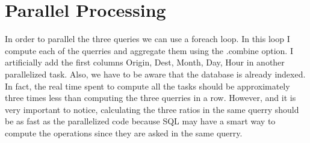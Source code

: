 \documentclass{llncs}\usepackage[]{graphicx}\usepackage[]{color}
\begin{document}
\section{Parallel Processing}
In order to parallel the three queries we can use a foreach loop. In this loop I compute each of the querries and aggregate them using the .combine option. I artificially add the first columns Origin, Dest, Month, Day, Hour in another parallelized task. Also, we have to be aware that the database is already indexed.\\
In fact, the real time spent to compute all the tasks should be approximately three times less than computing the three querries in a row. However, and it is very important to notice, calculating the three ratios in the same querry should be as fast as the parallelized code because SQL may have a smart way to compute the operations since they are asked in the same querry.
\end{document}
